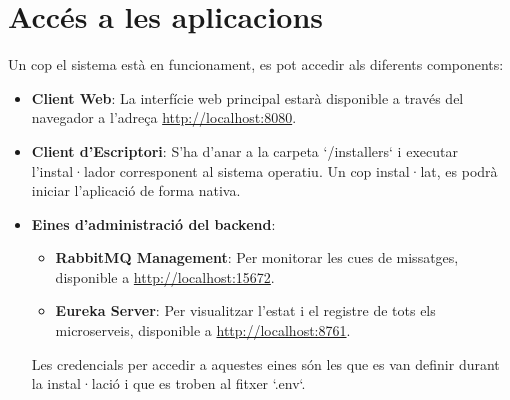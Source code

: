 \section{Accés a les aplicacions}
Un cop el sistema està en funcionament, es pot accedir als diferents components:

\begin{itemize}
    \item \textbf{Client Web}: La interfície web principal estarà disponible a través del navegador a l'adreça \href{http://localhost:8080}{http://localhost:8080}.
    
    \item \textbf{Client d'Escriptori}: S'ha d'anar a la carpeta `/installers` i executar l'instal·lador corresponent al sistema operatiu. Un cop instal·lat, es podrà iniciar l'aplicació de forma nativa.
    
    \item \textbf{Eines d'administració del backend}:
    \begin{itemize}
        \item \textbf{RabbitMQ Management}: Per monitorar les cues de missatges, disponible a \href{http://localhost:15672}{http://localhost:15672}.
        \item \textbf{Eureka Server}: Per visualitzar l'estat i el registre de tots els microserveis, disponible a \href{http://localhost:8761}{http://localhost:8761}.
    \end{itemize}
    Les credencials per accedir a aquestes eines són les que es van definir durant la instal·lació i que es troben al fitxer `.env`.
\end{itemize}
